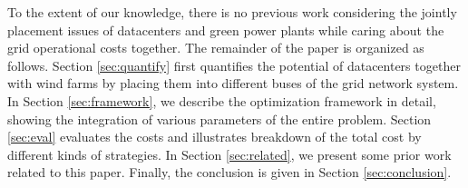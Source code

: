 To the extent of our knowledge, there is no previous work considering the jointly placement issues of datacenters and green power plants while caring about the grid operational costs together. The remainder of the paper is organized as follows. Section \ref{sec:quantify} first quantifies the potential of datacenters together with wind farms by placing them into different buses of the grid network system. In Section \ref{sec:framework}, we describe the optimization framework in detail, showing the integration of various parameters of the entire problem. Section \ref{sec:eval} evaluates the costs and illustrates breakdown of the total cost by different kinds of strategies. In Section \ref{sec:related}, we present some prior work related to this paper. Finally, the conclusion is given in Section \ref{sec:conclusion}.



